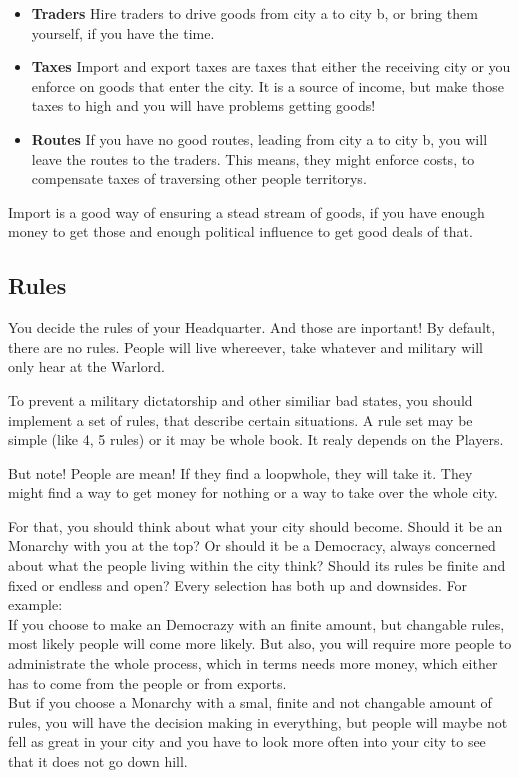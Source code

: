 \begin{itemize}
\item \textbf{Traders} Hire traders to drive goods from city a to city b, or bring them yourself, if you have the time.
\item \textbf{Taxes} Import and export taxes are taxes that either the receiving city or you enforce on goods that enter the city. It is a source of income, but make those taxes to high and you will have problems getting goods!
\item \textbf{Routes} If you have no good routes, leading from city a to city b, you will leave the routes to the traders. This means, they might enforce costs, to compensate taxes of traversing other people territorys.
\end{itemize}

Import is a good way of ensuring a stead stream of goods, if you have enough money to get those and enough political influence to get good deals of that.

\subsection{Rules}

You decide the rules of your Headquarter. And those are inportant! By default, there are no rules. People will live whereever, take whatever and military will only hear at the Warlord.

To prevent a military dictatorship and other similiar bad states, you should implement a set of rules, that describe certain situations. A rule set may be simple (like 4, 5 rules) or it may be whole book. It realy depends on the Players.

But note! People are mean! If they find a loopwhole, they will take it. They might find a way to get money for nothing or a way to take over the whole city.

For that, you should think about what your city should become. Should it be an Monarchy with you at the top? Or should it be a Democracy, always concerned about what the people living within the city think? Should its rules be finite and fixed or endless and open? Every selection has both up and downsides. For example:\\
If you choose to make an Democrazy with an finite amount, but changable rules, most likely people will come more likely. But also, you will require more people to administrate the whole process, which in terms needs more money, which either has to come from the people or from exports.\\
But if you choose a Monarchy with a smal, finite and not changable amount of rules, you will have the decision making in everything, but people will maybe not fell as great in your city and you have to look more often into your city to see that it does not go down hill.\\

